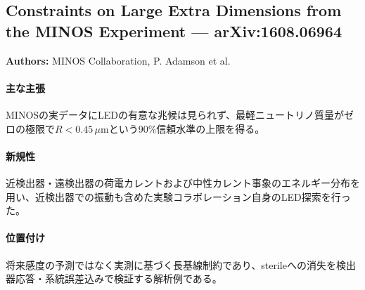 \subsection{Constraints on Large Extra Dimensions from the MINOS Experiment --- arXiv:1608.06964}

\textbf{Authors:} MINOS Collaboration, P. Adamson et al.

\paragraph{主な主張}
MINOSの実データにLEDの有意な兆候は見られず、最軽ニュートリノ質量がゼロの極限で$R<0.45\,\mu\mathrm{m}$という90\%信頼水準の上限を得る\cite{MINOS:2016LEDConstraints}。

\paragraph{新規性}
近検出器・遠検出器の荷電カレントおよび中性カレント事象のエネルギー分布を用い、近検出器での振動も含めた実験コラボレーション自身のLED探索を行った。

\paragraph{位置付け}
将来感度の予測ではなく実測に基づく長基線制約であり、sterileへの消失を検出器応答・系統誤差込みで検証する解析例である。
